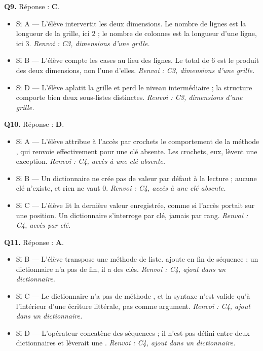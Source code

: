 \textbf{Q9.} Réponse : \textbf{C}.
\begin{itemize}[nosep]
  \item Si A — L'élève intervertit les deux dimensions. Le nombre de lignes est la longueur de la grille, ici $2$ ; le nombre de colonnes est la longueur d'une ligne, ici $3$. \emph{Renvoi : C3, dimensions d'une grille.}
  \item Si B — L'élève compte les cases au lieu des lignes. Le total de $6$ est le produit des deux dimensions, non l'une d'elles. \emph{Renvoi : C3, dimensions d'une grille.}
  \item Si D — L'élève aplatit la grille et perd le niveau intermédiaire ; la structure comporte bien deux sous-listes distinctes. \emph{Renvoi : C3, dimensions d'une grille.}
\end{itemize}

\textbf{Q10.} Réponse : \textbf{D}.
\begin{itemize}[nosep]
  \item Si A — L'élève attribue à l'accès par crochets le comportement de la méthode , qui renvoie effectivement  pour une clé absente. Les crochets, eux, lèvent une exception. \emph{Renvoi : C4, accès à une clé absente.}
  \item Si B — Un dictionnaire ne crée pas de valeur par défaut à la lecture ; aucune clé  n'existe, et rien ne vaut $0$. \emph{Renvoi : C4, accès à une clé absente.}
  \item Si C — L'élève lit la dernière valeur enregistrée, comme si l'accès portait sur une position. Un dictionnaire s'interroge par clé, jamais par rang. \emph{Renvoi : C4, accès par clé.}
\end{itemize}

\textbf{Q11.} Réponse : \textbf{A}.
\begin{itemize}[nosep]
  \item Si B — L'élève transpose une méthode de liste.  ajoute en fin de séquence ; un dictionnaire n'a pas de fin, il a des clés. \emph{Renvoi : C4, ajout dans un dictionnaire.}
  \item Si C — Le dictionnaire n'a pas de méthode , et la syntaxe  n'est valide qu'à l'intérieur d'une écriture littérale, pas comme argument. \emph{Renvoi : C4, ajout dans un dictionnaire.}
  \item Si D — L'opérateur \code{+} concatène des séquences ; il n'est pas défini entre deux dictionnaires et lèverait une . \emph{Renvoi : C4, ajout dans un dictionnaire.}
\end{itemize}

